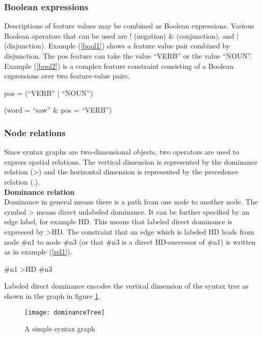 \documentclass[]{scrartcl}
\theoremstyle{exmp}
\begin{document}
\subsubsection{Boolean expressions}
Descriptions of feature values may be combined as Boolean expressions. Various Boolean operators that can be used are ! (negation) \& (conjunction), and | (disjunction). Example (\ref{bool1}) shows a feature value pair combined by disjunction. The pos feature can take the value ``VERB'' or the value ``NOUN''. Example (\ref{bool2}) is a complex feature constraint consisting of a Boolean expressions over two feature-value pairs. 
\begin{exe}
	\ex \label{bool1}
	pos = (``VERB'' | ``NOUN'') 
\end{exe}
\begin{exe}
	\ex \label{bool2}
	(word = ``saw'' \& pos = ``VERB'')
\end{exe}
\vspace{0.2cm}

\subsubsection{Node relations}
Since syntax graphs are two-dimensional objects, two operators are used to express spatial relations. The vertical dimension is represented by the dominance relation (>) and the horizontal dimension is represented by the precedence relation (.). \\

\textbf{Dominance relation}\\
Dominance in general means there is a path from one node to another node. The symbol > means direct unlabeled dominance. It can be further specified by an edge label, for example HD. This means that labeled direct dominance is expressed by >HD. The constraint that an edge which is labeled HD leads from node \#n1 to node \#n3 (or that \#n3 is a direct HD-successor of \#n1) is written as in example (\ref{rel1}). 
\begin{exe}
	\ex \label{rel1}
	\#n1 >HD \#n3
\end{exe}
\vspace{0.2cm}
Labeled direct dominance encodes the vertical dimension of the syntax tree as shown in the graph in figure \ref{graph1}. 

\begin{figure}[h]
\texttt{[image: dominanceTree]}
\centering
\caption{A simple syntax graph}
\label{graph1}
\end{figure}
\end{document}
